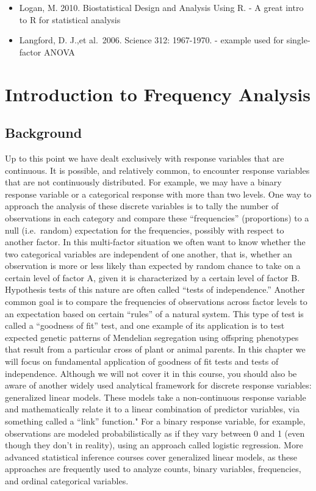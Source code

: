 \documentclass[]{book}
\begin{document}
\begin{itemize}
\item
  Logan, M. 2010. Biostatistical Design and Analysis Using R. - A great intro to R for statistical analysis
\item
  Langford, D. J.,et al.~2006. Science 312: 1967-1970. - example used for single-factor ANOVA
\end{itemize}

\hypertarget{introduction-to-frequency-analysis}{%
\chapter{Introduction to Frequency Analysis}\label{introduction-to-frequency-analysis}}

\hypertarget{background-8}{%
\section{Background}\label{background-8}}

Up to this point we have dealt exclusively with response variables that are continuous. It is possible, and relatively common, to encounter response variables that are not continuously distributed. For example, we may have a binary response variable or a categorical response with more than two levels. One way to approach the analysis of these discrete variables is to tally the number of observations in each category and compare these ``frequencies'' (proportions) to a null (i.e.~random) expectation for the frequencies, possibly with respect to another factor. In this multi-factor situation we often want to know whether the two categorical variables are independent of one another, that is, whether an observation is more or less likely than expected by random chance to take on a certain level of factor A, given it is characterized by a certain level of factor B. Hypothesis tests of this nature are often called ``tests of independence.'' Another common goal is to compare the frequencies of observations across factor levels to an expectation based on certain ``rules'' of a natural system. This type of test is called a ``goodness of fit'' test, and one example of its application is to test expected genetic patterns of Mendelian segregation using offspring phenotypes that result from a particular cross of plant or animal parents. In this chapter we will focus on fundamental application of goodness of fit tests and tests of independence. Although we will not cover it in this course, you should also be aware of another widely used analytical framework for discrete response variables: generalized linear models. These models take a non-continuous response variable and mathematically relate it to a linear combination of predictor variables, via something called a ``link'' function." For a binary response variable, for example, observations are modeled probabilistically as if they vary between 0 and 1 (even though they don't in reality), using an approach called logistic regression. More advanced statistical inference courses cover generalized linear models, as these approaches are frequently used to analyze counts, binary variables, frequencies, and ordinal categorical variables.
\end{document}
